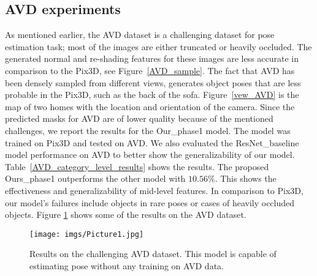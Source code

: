 \documentclass[letterpaper, 10 pt, conference]{ieeeconf}  \pdfoutput=1
\begin{document}
\subsection{AVD experiments}
As mentioned earlier, the AVD dataset is a challenging dataset for pose estimation task; most of the images are either truncated or heavily occluded. The generated normal and re-shading features for these images are less accurate in comparison to the Pix3D, see Figure~\ref{AVD_sample}. The fact that AVD has been densely sampled from different views, generates object poses that are less probable in the Pix3D, such as the back of the sofa. Figure~\ref{vew_AVD} is the map of two homes with the location and orientation of the camera. Since the predicted masks for AVD are of lower quality because of the mentioned challenges, we report the results for the Our\_phase1 model. The model was trained on Pix3D and tested on AVD. We also evaluated the ResNet\_baseline model performance on AVD to better show the generalizability of our model. Table~\ref{AVD_category_level_results} shows the results. The proposed Ours\_phase1 outperforms the other model with $10.56\%$. This shows the effectiveness and generalizability of mid-level features. In comparison to Pix3D, our model's failures include objects in rare poses or cases of heavily occluded objects. Figure \ref{ssresults} shows some of the results on the AVD dataset.

\begin{figure}[htbp]

\begin{center}
\texttt{[image: imgs/Picture1.jpg]}
\end{center}
  \caption{Results on the challenging AVD dataset. This model is capable of estimating pose without any training on AVD data.}
\label{ssresults}
\end{figure}
\begin{table}
\vspace{8pt}
\centering
{}
\caption{Per category accuracy of two models on AVD dataset. The results are for 9 bins with $2.5^\circ$ overlap. }
\label{AVD_category_level_results}
\end{table}
\end{document}
